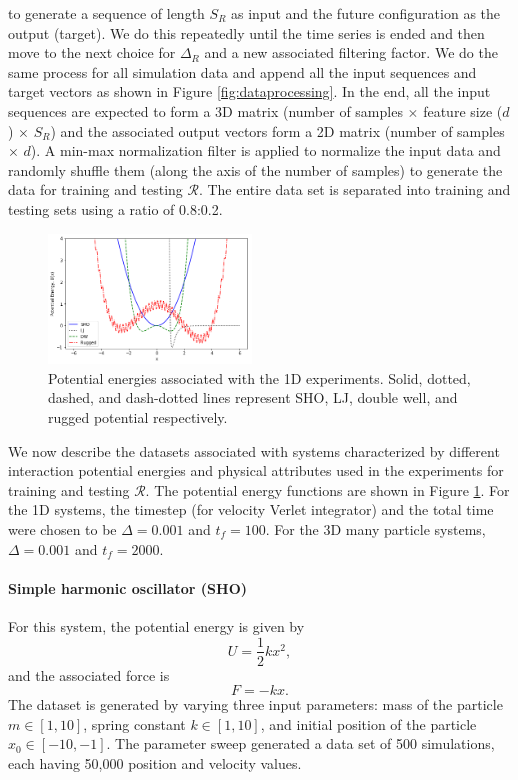 \documentclass[aps,prl,twocolumn,superscriptaddress,tightenlines,longbibliography, reprint]{revtex4-1}
\newcommand{\R}{$\mathscr{R}$}
\begin{document}
to generate a sequence of length $S_R$ as input and the future configuration as the output (target). We do this repeatedly until the time series is ended and then move to the next choice for $\Delta_{R}$ and a new associated filtering factor. We do the same process for all simulation data and append all the input sequences and target vectors as shown in Figure \ref{fig:dataprocessing}. In the end, all the input sequences are expected to form a 3D matrix (number of samples $\times$ feature size ($d$) $\times$ $S_R$) and the associated output vectors form a 2D matrix (number of samples $\times$ $d$). A min-max normalization filter is applied to normalize the input data and randomly shuffle them (along the axis of the number of samples) to generate the data for training and testing $\mathscr{R}$. The entire data set is separated into training and testing sets using a ratio of 0.8:0.2.

\begin{figure}[thb]
\centering
\includegraphics[width=0.48\textwidth]{figures/fig7.png}
\caption{Potential energies associated with the 1D experiments. Solid, dotted, dashed, and dash-dotted lines represent SHO, LJ, double well, and rugged potential respectively.}
\label{fig:potential_plots}
\end{figure}
We now describe the datasets associated with systems characterized by different interaction potential energies and physical attributes used in the experiments for training and testing \R. The potential energy functions are shown in Figure \ref{fig:potential_plots}.
For the 1D systems, the timestep (for velocity Verlet integrator) and the total time were chosen to be $\Delta = 0.001$ and $t_f = 100$.
For the 3D many particle systems, $\Delta = 0.001$ and $t_f = 2000$.
%
\paragraph{Simple harmonic oscillator (SHO)}
For this system, the potential energy is given by
\begin{equation} \label{eq:data1}
U = \frac{1}{2} k x^2,
\end{equation}
and the associated force is
\begin{equation} \label{eq:data2}
F = - k x.
\end{equation}
The dataset is generated by varying three input parameters: mass of the particle $m \in [1, 10]$, spring constant $k \in [1, 10]$, and initial position of the particle  $x_0 \in [-10, -1]$. The parameter sweep generated a data set of 500 simulations, each having 50,000 position and velocity values.
\end{document}
